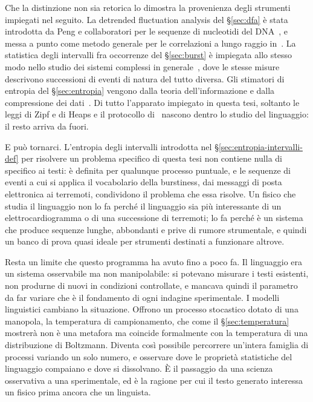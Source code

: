 Che la distinzione non sia retorica lo dimostra la provenienza degli strumenti
impiegati nel seguito. La detrended fluctuation analysis del §\ref{sec:dfa} è
stata introdotta da Peng e collaboratori per le sequenze di nucleotidi del
DNA~\cite{peng1994}, e messa a punto come metodo generale per le correlazioni a
lungo raggio in~\cite{kantelhardt2001}. La statistica degli intervalli fra
occorrenze del §\ref{sec:burst} è impiegata allo stesso modo nello studio dei
sistemi complessi in generale~\cite{goh2008}, dove le stesse misure descrivono
successioni di eventi di natura del tutto diversa. Gli stimatori di entropia del
§\ref{sec:entropia} vengono dalla teoria dell'informazione e dalla compressione
dei dati~\cite{ziv1977,ziv1993}. Di tutto l'apparato impiegato in questa tesi,
soltanto le leggi di Zipf e di Heaps e il protocollo di~\cite{altmann2012}
nascono dentro lo studio del linguaggio: il resto arriva da fuori.

E può tornarci. L'entropia degli intervalli introdotta nel
§\ref{sec:entropia-intervalli-def} per risolvere un problema specifico di questa
tesi non contiene nulla di specifico ai testi: è definita per qualunque processo
puntuale, e le sequenze di eventi a cui si applica il vocabolario della
burstiness, dai messaggi di posta elettronica ai terremoti, condividono il
problema che essa risolve. Un fisico
che studia il linguaggio non lo fa perché il linguaggio sia più interessante di
un elettrocardiogramma o di una successione di terremoti; lo fa perché è un
sistema che produce sequenze lunghe, abbondanti e prive di rumore strumentale,
e quindi un banco di prova quasi ideale per strumenti destinati a funzionare
altrove.

Resta un limite che questo programma ha avuto fino a poco fa. Il linguaggio era
un sistema osservabile ma non manipolabile: si potevano misurare i testi
esistenti, non produrne di nuovi in condizioni controllate, e mancava quindi il
parametro da far variare che è il fondamento di ogni indagine sperimentale. I
modelli linguistici cambiano la situazione. Offrono un processo stocastico
dotato di una manopola, la temperatura di campionamento, che come il
§\ref{sec:temperatura} mostrerà non è una metafora ma coincide formalmente con
la temperatura di una distribuzione di Boltzmann. Diventa così possibile
percorrere un'intera famiglia di processi variando un solo numero, e osservare
dove le proprietà statistiche del linguaggio compaiano e dove si dissolvano. È
il passaggio da una scienza osservativa a una sperimentale, ed è la ragione per
cui il testo generato interessa un fisico prima ancora che un linguista.


